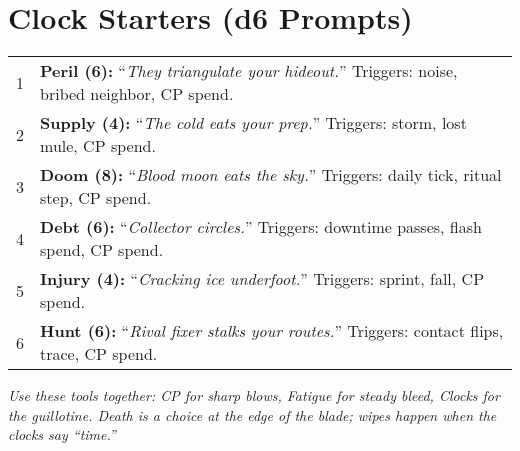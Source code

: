 \documentclass[12pt]{book}
\begin{document}
\section{Clock Starters (d6 Prompts)}
\begin{tabular}{@{}r p{11.5cm}@{}}
1 & \textbf{Peril (6):} ``\emph{They triangulate your hideout.}'' Triggers: noise, bribed neighbor, CP spend.\\
2 & \textbf{Supply (4):} ``\emph{The cold eats your prep.}'' Triggers: storm, lost mule, CP spend.\\
3 & \textbf{Doom (8):} ``\emph{Blood moon eats the sky.}'' Triggers: daily tick, ritual step, CP spend.\\
4 & \textbf{Debt (6):} ``\emph{Collector circles.}'' Triggers: downtime passes, flash spend, CP spend.\\
5 & \textbf{Injury (4):} ``\emph{Cracking ice underfoot.}'' Triggers: sprint, fall, CP spend.\\
6 & \textbf{Hunt (6):} ``\emph{Rival fixer stalks your routes.}'' Triggers: contact flips, trace, CP spend.\\
\end{tabular}

\bigskip
\noindent\emph{Use these tools together: CP for sharp blows, Fatigue for steady bleed, Clocks for the guillotine. Death is a choice at the edge of the blade; wipes happen when the clocks say ``time.''}
\end{document}
